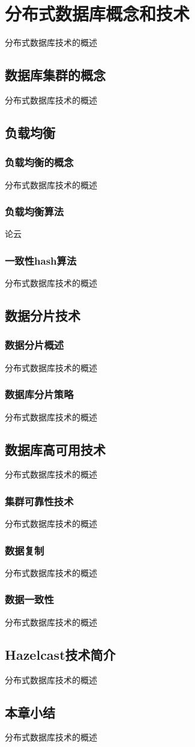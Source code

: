 
\chapter{分布式数据库概念和技术}
分布式数据库技术的概述
\section{数据库集群的概念}
分布式数据库技术的概述

\section{负载均衡}

\subsection{负载均衡的概念}
分布式数据库技术的概述

\subsection{负载均衡算法}
论云

\subsection{一致性hash算法}
分布式数据库技术的概述

\section{数据分片技术}

\subsection{数据分片概述}
分布式数据库技术的概述
\subsection{数据库分片策略}
分布式数据库技术的概述
\section{数据库高可用技术}
分布式数据库技术的概述
\subsection{集群可靠性技术}
分布式数据库技术的概述
\subsection{数据复制}
分布式数据库技术的概述
\subsection{数据一致性}
分布式数据库技术的概述


\section{Hazelcast技术简介}
分布式数据库技术的概述
\section{本章小结}
分布式数据库技术的概述